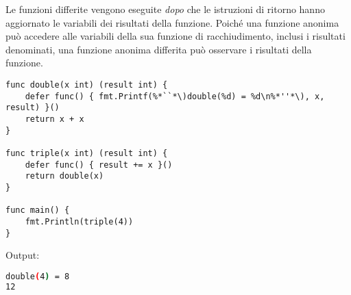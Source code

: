 Le funzioni differite vengono eseguite \textit{dopo} che le istruzioni di ritorno hanno aggiornato le variabili dei risultati della funzione.
Poiché una funzione anonima può accedere alle variabili della sua funzione di racchiudimento, inclusi i risultati denominati, una funzione anonima differita può osservare i risultati della funzione.
\begin{lstlisting}[frame=single, label={lst:lstlisting4-8.5}]
func double(x int) (result int) {
    defer func() { fmt.Printf(%*``*\)double(%d) = %d\n%*''*\), x, result) }()
    return x + x
}

func triple(x int) (result int) {
    defer func() { result += x }()
    return double(x)
}

func main() {
    fmt.Println(triple(4))
}
\end{lstlisting}
Output:
\begin{lstlisting}[language=bash, frame=L, label={lst:lstlisting4-8.6}]
double(4) = 8
12
\end{lstlisting}